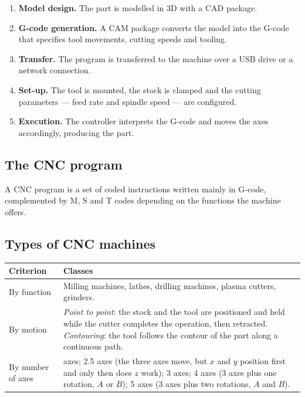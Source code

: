 \documentclass[11pt]{article}
\begin{document}
\begin{enumerate}[leftmargin=*]
  \item \textbf{Model design.} The part is modelled in 3D with a CAD package.
  \item \textbf{G-code generation.} A CAM package converts the model into the G-code that
        specifies tool movements, cutting speeds and tooling.
  \item \textbf{Transfer.} The program is transferred to the machine over a USB drive or a
        network connection.
  \item \textbf{Set-up.} The tool is mounted, the stock is clamped and the cutting
        parameters --- feed rate and spindle speed --- are configured.
  \item \textbf{Execution.} The controller interprets the G-code and moves the axes
        accordingly, producing the part.
\end{enumerate}

\subsection{The CNC program}

A CNC program is a set of coded instructions written mainly in G-code, complemented by M,
S and T codes depending on the functions the machine offers.

\subsection{Types of CNC machines}

\begin{center}
\begin{tabular}{@{}l>{\raggedright\arraybackslash}p{10.7cm}@{}}
\toprule
\textbf{Criterion} & \textbf{Classes} \\
\midrule
By function & Milling machines, lathes, drilling machines, plasma cutters, grinders. \\
By motion   & \emph{Point to point}: the stock and the tool are positioned and held while
              the cutter completes the operation, then retracted.
              \emph{Contouring}: the tool follows the contour of the part along a
              continuous path. \\
By number of axes & 2 axes; 2.5 axes (the three axes move, but $x$ and $y$ position first
              and only then does $z$ work); 3 axes; 4 axes (3 axes plus one rotation,
              $A$ or $B$); 5 axes (3 axes plus two rotations, $A$ and $B$). \\
\bottomrule
\end{tabular}
\end{center}
\end{document}
